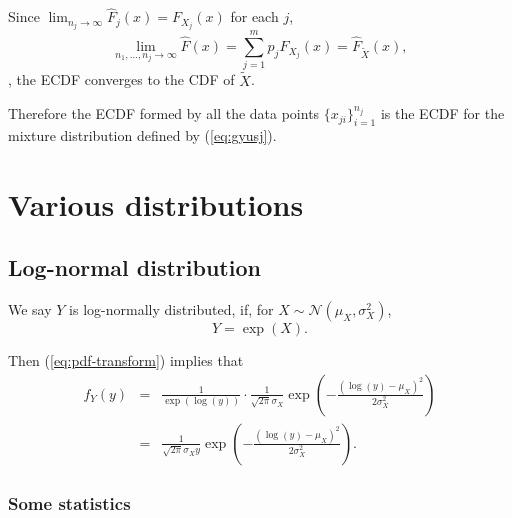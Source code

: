 Since $\lim_{n_j\to\infty} \hat{F}_j(x) = F_{X_j}(x)$ for each $j$,
\begin{equation}
\lim_{n_1, \ldots, n_j \to\infty} \hat{F}(x) = \sum_{j=1}^m p_j F_{X_j}(x) = \hat{F}_{\tilde{X}}(x),
\end{equation}
\ie,
the ECDF converges to the CDF of $\tilde{X}$.

Therefore the ECDF formed by all the data points $\{x_{ji}\}_{i=1}^{n_j}$
is the ECDF for the mixture distribution defined by (\ref{eq:gyusj}).



\chapter{Various distributions}

\section{Log-normal distribution}

 We say $Y$ is log-normally distributed, if, for $X\sim\mathcal{N}(\mu_X,\sigma_X^2)$,
 \begin{equation}
 Y = \exp(X).
 \end{equation}

Then (\ref{eq:pdf-transform}) implies that
\begin{eqnarray}
f_Y(y) &=& \frac{1}{\exp(\log(y))} \cdot \frac{1}{\sqrt{2\pi} \sigma_X}  \exp\left(-\frac{(\log(y)-\mu_X)^2}{2\sigma_X^2}\right)
\nonumber
\\
&=& \frac{1}{\sqrt{2\pi} \sigma_X y}  \exp\left(-\frac{(\log(y)-\mu_X)^2}{2\sigma_X^2}\right).
\label{eq:log-normal-pdf}
\end{eqnarray}


\subsection{Some statistics}

